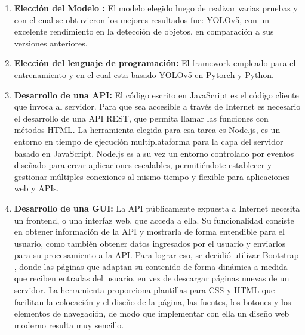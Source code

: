 \begin{enumerate}

    \item \textbf{Elección del Modelo :} El modelo elegido luego de realizar varias pruebas y con el cual se obtuvieron los mejores resultados fue: YOLOv5, con un excelente rendimiento en la detección de objetos, en comparación a sus versiones anteriores.
    
    \item \textbf{Elección del lenguaje de programación:} El framework empleado para el entrenamiento y en el cual esta basado YOLOv5 \cite{yolov5} en Pytorch y Python.
    
    \item \textbf{Desarrollo de una API: }El código escrito en JavaScript es el código cliente que invoca al servidor. Para que sea accesible a través de Internet es necesario el desarrollo de una API REST, que permita llamar las funciones con métodos HTML. La herramienta elegida para esa tarea es Node.js, es un entorno en tiempo de ejecución multiplataforma para la capa del servidor basado en JavaScript. Node.js es a su vez un entorno controlado por eventos diseñado para crear aplicaciones escalables, permitiéndote establecer y gestionar múltiples conexiones al mismo tiempo y flexible para aplicaciones web y APIs.
    
    \item \textbf{Desarrollo de una GUI:} La API públicamente expuesta a Internet necesita un frontend, o una interfaz web, que acceda a ella. Su funcionalidad consiste en obtener información de la API y mostrarla de forma entendible para el usuario, como también obtener datos ingresados por el usuario y enviarlos para su procesamiento a la API.
    Para lograr eso, se decidió utilizar Bootstrap \cite{bootstrap}, donde las páginas que adaptan su contenido de forma dinámica a medida que reciben entradas del usuario, en vez de descargar páginas nuevas de un servidor. La herramienta proporciona plantillas para CSS y HTML que facilitan la colocación y el diseño de la página, las fuentes, los botones y los elementos de navegación, de modo que implementar con ella un diseño web moderno resulta muy sencillo.
    

\end{enumerate}
